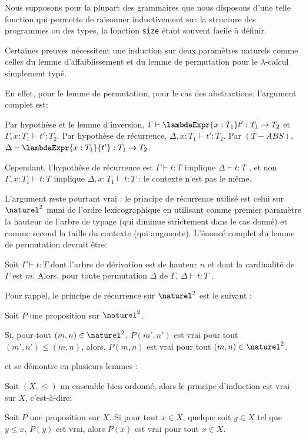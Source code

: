 Nous supposons pour la plupart des grammaires que nous disposons d'une telle
fonction qui permette de raisonner inductivement sur la structure des
programmes ou des types, la fonction \verb|size| étant souvent facile à définir.

Certaines preuves nécessitent une induction sur deux paramètres naturels comme celles
du lemme d'affaiblissement et du lemme de permutation pour le $\lambda$-calcul
simplement typé.

En effet, pour le lemme de permutation, pour le cas des abstractions, l'argument
complet est:

\og Par hypothèse et le lemme d'inversion, $\Gamma \vdash \lambdaExpr{x : T_{1}}
t' : T_{1} \rightarrow T_{2}$ et $\Gamma, x : T_{1} \vdash t' : T_{2}$. Par
hypothèse de récurrence, $\Delta, x : T_{1} \vdash t' : T_{2}$. Par $(T-ABS)$,
$\Delta \vdash \lambdaExpr{x : T_{1}}{t'} : T_{1} \rightarrow T_{2}$. \fg

Cependant, l'hypothèse de récurrence est \og $\Gamma \vdash t : T$ implique $\Delta
\vdash t : T$ \fg, et non \og $\Gamma, x : T_{1} \vdash t : T$ implique $\Delta, x :
T_{1} \vdash t : T$ \fg : le contexte n'est pas le même.

L'argument reste pourtant vrai : le principe de récurrence utilisé est celui sur
$\naturel^{2}$ muni de l'ordre lexicographique en utilisant comme premier
paramètre la hauteur de l'arbre de typage (qui diminue strictement dans le cas donné) et
comme second la taille du contexte (qui augmente). L'énoncé complet du lemme de
permutation devrait être:

\og Soit $\Gamma \vdash t : T$ dont l'arbre de dérivation est de hauteur $n$ et
dont la cardinalité de $\Gamma$ est $m$. Alors, pour toute permutation $\Delta$ de
$\Gamma$, $\Delta \vdash t : T$ \fg.

Pour rappel, le principe de récurrence sur $\naturel^{2}$ est le suivant :
\begin{proposition}
  Soit $P$ une proposition sur $\naturel^{2}$.

  Si, pour tout $(m, n) \in \naturel^{2}$, $P(m', n')$ est vrai pour tout $(m',
  n') \leq (m, n)$, alors, $P(m, n)$ est vrai pour tout $(m, n) \in \naturel^{2}$.
\end{proposition}

et se démontre en plusieurs lemmes :

\begin{lemma} 
  Soit $(X, \leq)$ un ensemble bien ordonné, alors le principe d'induction est
  vrai sur $X$, c'est-à-dire:

  Soit $P$ une proposition sur $X$.
  Si pour tout $x \in X$, quelque soit $y \in X$ tel que $y \leq x$, $P(y)$ est
  vrai, alors $P(x)$ est vrai pour tout $x \in X$.
\end{lemma}

